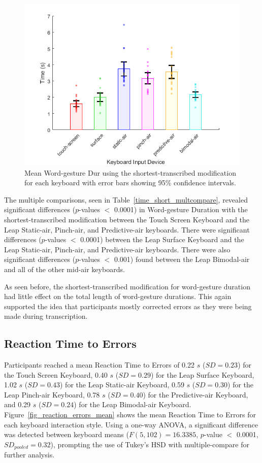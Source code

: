 \begin{figure}[!t]
	\centering
	\includegraphics{Figures/fig_time_short_mean}
	\caption[Mean Word-gesture Duration for Modified-shortest]{Mean Word-gesture Dur using the shortest-transcribed modification for each keyboard with error bars showing 95\% confidence intervals.}
	\label{fig_time_short_mean}
\end{figure}

The multiple comparisons, seen in Table~\ref{time_short_multcompare}, revealed significant differences ($p$-values $<$ 0.0001) in Word-gesture Duration with the shortest-transcribed modification between the Touch Screen Keyboard and the Leap Static-air, Pinch-air, and Predictive-air keyboards. There were significant differences ($p$-values $<$ 0.0001) between the Leap Surface Keyboard and the Leap Static-air, Pinch-air, and Predictive-air keyboards. There were also significant differences ($p$-values $<$ 0.001) found between the Leap Bimodal-air and all of the other mid-air keyboards.

As seen before, the shortest-transcribed modification for word-gesture duration had little effect on the total length of word-gesture durations. This again supported the idea that participants mostly corrected errors as they were being made during transcription.

\subsection{Reaction Time to Errors}
Participants reached a mean Reaction Time to Errors of 0.22 $s$ ($SD = 0.23$) for the Touch Screen Keyboard, 0.40 $s$ ($SD = 0.29$) for the Leap Surface Keyboard, 1.02 $s$ ($SD = 0.43$) for the Leap Static-air Keyboard, 0.59 $s$ ($SD = 0.30$) for the Leap Pinch-air Keyboard, 0.78 $s$ ($SD = 0.40$) for the Predictive-air Keyboard, and 0.29 $s$ ($SD = 0.24$) for the Leap Bimodal-air Keyboard. Figure~\ref{fig_reaction_errors_mean} shows the mean Reaction Time to Errors for each keyboard interaction style. Using a one-way ANOVA, a significant difference was detected between keyboard means ($F(5, 102) = 16.3385$, $p$-value $<$ 0.0001, $SD_{pooled} = 0.32$), prompting the use of Tukey's HSD with multiple-compare for further analysis.

